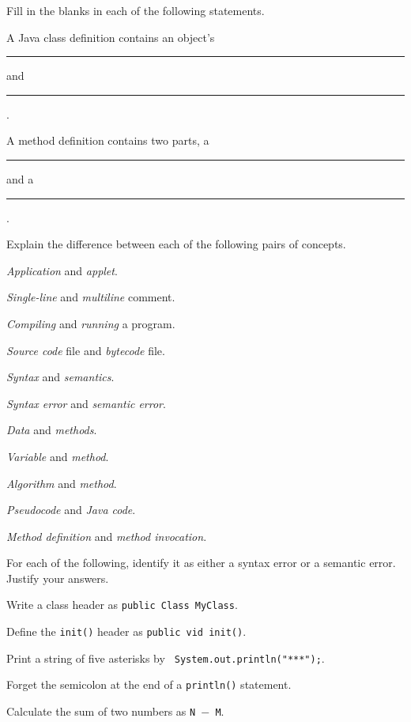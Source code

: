 \newpage
\begin{EXRtwo}

\item  Fill in the blanks in each of the following statements.
\begin{EXRtwoLL}
\baselineskip=14pt\item  A Java class definition contains an object's 
\rule{20pt}{0.5pt}  and
\rule{20pt}{0.5pt}.
\item  A method definition contains two parts, a \rule{20pt}{0.5pt} 
and a \rule{20pt}{0.5pt}.
\end{EXRtwoLL}
\baselineskip=11pt
\item  Explain the difference between each of the following pairs of
concepts.

\begin{EXRtwoLL}
\item  {\it Application} and {\it applet}.
\item  {\it Single-line} and {\it multiline} comment.
\item  {\it Compiling} and {\it running} a program.
\item  {\it Source code} file and {\it bytecode} file.
\item  {\it Syntax} and {\it semantics}.
\item  {\it Syntax error} and {\it semantic error}.
\item  {\it Data} and {\it methods}.
\item  {\it Variable} and {\it method}.
\item  {\it Algorithm} and {\it method}.
\item  {\it Pseudocode} and {\it Java code}.
\item  {\it Method definition} and {\it method invocation}.
\end{EXRtwoLL}

\item  For each of the following, identify it as either a
syntax error or a semantic error.  Justify your answers.

\begin{EXRtwoLL}
\item  Write a class header as {\tt public Class MyClass}.
\item  Define the {\tt init()} header as {\tt public vid init()}.
\item  Print a string of five asterisks by {\tt 
System.out.println("***");}.
\item  Forget the semicolon at the end of a {\tt println()} statement.
\item  Calculate the sum of two numbers as {\tt N $-$ M}.
\end{EXRtwoLL}


\end{EXRtwo}
